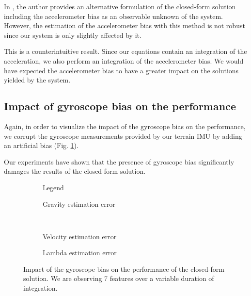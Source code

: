 \documentclass[letterpaper, 10 pt, conference]{ieeeconf}  %
\begin{document}
In \cite{Martinelli2014}, the author provides an alternative formulation of the closed-form solution including the accelerometer bias as an observable unknown of the system.
However, the estimation of the accelerometer bias with this method is not robust since our system is only slightly affected by it.

This is a counterintuitive result. Since our equations contain an integration of the acceleration, we also perform an integration of the accelerometer bias.
We would have expected the accelerometer bias to have a greater impact on the solutions yielded by the system.



\subsection{Impact of gyroscope bias on the performance}
Again, in order to visualize the impact of the gyroscope bias on the performance,
we corrupt the gyroscope measurements provided by our terrain IMU by adding an artificial bias (Fig. \ref{fig:biasGyroCF}).

Our experiments have shown that the presence of gyroscope bias significantly damages the results of the closed-form solution.

\begin{figure}
  \centering
        \hspace{0.2\columnwidth}%
        \begin{subfigure}[b]{0.3\columnwidth}
                \resizebox{\columnwidth}{!}{}
                \caption{Legend}

        \end{subfigure}%
        \begin{subfigure}[b]{0.5\columnwidth}
                \resizebox{\columnwidth}{!}{}
                \caption{Gravity estimation error}

        \end{subfigure}
        ~
        \begin{subfigure}[b]{0.5\columnwidth}
                \resizebox{\columnwidth}{!}{}
                \caption{Velocity estimation error}

        \end{subfigure}%
        \begin{subfigure}[b]{0.5\columnwidth}
                \resizebox{\columnwidth}{!}{}
                \caption{Lambda estimation error}

        \end{subfigure}
        \caption{Impact of the gyroscope bias on the performance of the closed-form solution. We are observing 7 features over a variable duration of integration. \label{fig:biasGyroCF}}
\end{figure}
\end{document}
